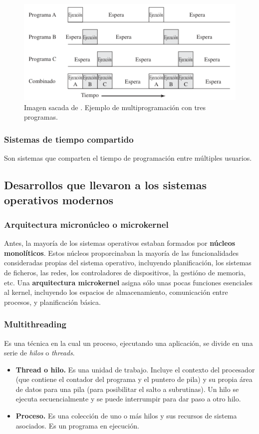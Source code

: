 \documentclass[12pt]{article}
\begin{document}
  \begin{figure}[H]
    \centering
    \includegraphics[width=0.5\linewidth]{imagenes/multiprogramacion.png}
    \caption{Imagen sacada de \parencite{sostallings}. Ejemplo de multiprogramación con tres programas.}
    \label{fig:multiprog}
  \end{figure}
  

  \subsubsection{Sistemas de tiempo compartido}
  Son sistemas que comparten el tiempo de programación entre múltiples usuarios.

  \subsection{Desarrollos que llevaron a los sistemas operativos modernos}
  \subsubsection{Arquitectura micronúcleo o microkernel}
  Antes, la mayoría de los sistemas operativos estaban formados por \textbf{núcleos monolíticos}. Estos núcleos proporcinaban la mayoría de las funcionalidades consideradas propias del sistema operativo, incluyendo planificación, los sistemas de ficheros, las redes, los controladores de dispositivos, la gestióno de memoria, etc. Una \textbf{arquitectura microkernel} asigna sólo unas pocas funciones esenciales al kernel, incluyendo los espacios de almacenamiento, comunicación entre procesos, y planificación básica.

  \subsubsection{Multithreading}
  Es una técnica en la cual un proceso, ejecutando una aplicación, se divide en una serie de \textit{hilos} o \textit{threads}.
  \begin{itemize}
    \item \textbf{Thread o hilo.} Es una unidad de trabajo. Incluye el contexto del procesador (que contiene el contador del programa y el puntero de pila) y su propia área de datos para una pila (para posibilitar el salto a subrutinas). Un hilo se ejecuta secuencialmente y se puede interrumpir para dar paso a otro hilo.

    \item \textbf{Proceso.} Es una colección de uno o más hilos y sus recursos de sistema asociados. Es un programa en ejecución.
  \end{itemize}
\end{document}
